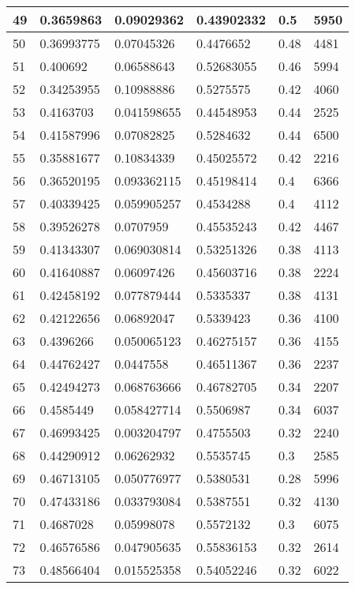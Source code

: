 \begin{longtable}{|l|l|l|l|l|l|}
49 & 0.3659863 & 0.09029362 & 0.43902332 & 0.5 & 5950 \\ \hline 
50 & 0.36993775 & 0.07045326 & 0.4476652 & 0.48 & 4481 \\ \hline 
51 & 0.400692 & 0.06588643 & 0.52683055 & 0.46 & 5994 \\ \hline 
52 & 0.34253955 & 0.10988886 & 0.5275575 & 0.42 & 4060 \\ \hline 
53 & 0.4163703 & 0.041598655 & 0.44548953 & 0.44 & 2525 \\ \hline 
54 & 0.41587996 & 0.07082825 & 0.5284632 & 0.44 & 6500 \\ \hline 
55 & 0.35881677 & 0.10834339 & 0.45025572 & 0.42 & 2216 \\ \hline 
56 & 0.36520195 & 0.093362115 & 0.45198414 & 0.4 & 6366 \\ \hline 
57 & 0.40339425 & 0.059905257 & 0.4534288 & 0.4 & 4112 \\ \hline 
58 & 0.39526278 & 0.0707959 & 0.45535243 & 0.42 & 4467 \\ \hline 
59 & 0.41343307 & 0.069030814 & 0.53251326 & 0.38 & 4113 \\ \hline 
60 & 0.41640887 & 0.06097426 & 0.45603716 & 0.38 & 2224 \\ \hline 
61 & 0.42458192 & 0.077879444 & 0.5335337 & 0.38 & 4131 \\ \hline 
62 & 0.42122656 & 0.06892047 & 0.5339423 & 0.36 & 4100 \\ \hline 
63 & 0.4396266 & 0.050065123 & 0.46275157 & 0.36 & 4155 \\ \hline 
64 & 0.44762427 & 0.0447558 & 0.46511367 & 0.36 & 2237 \\ \hline 
65 & 0.42494273 & 0.068763666 & 0.46782705 & 0.34 & 2207 \\ \hline 
66 & 0.4585449 & 0.058427714 & 0.5506987 & 0.34 & 6037 \\ \hline 
67 & 0.46993425 & 0.003204797 & 0.4755503 & 0.32 & 2240 \\ \hline 
68 & 0.44290912 & 0.06262932 & 0.5535745 & 0.3 & 2585 \\ \hline 
69 & 0.46713105 & 0.050776977 & 0.5380531 & 0.28 & 5996 \\ \hline 
70 & 0.47433186 & 0.033793084 & 0.5387551 & 0.32 & 4130 \\ \hline 
71 & 0.4687028 & 0.05998078 & 0.5572132 & 0.3 & 6075 \\ \hline 
72 & 0.46576586 & 0.047905635 & 0.55836153 & 0.32 & 2614 \\ \hline 
73 & 0.48566404 & 0.015525358 & 0.54052246 & 0.32 & 6022 \\ \hline 

\end{longtable}
